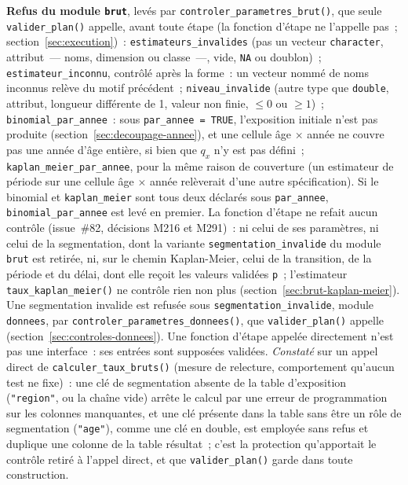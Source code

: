 \documentclass[a4paper,11pt]{article}
\newcommand{\code}[1]{\texttt{\small #1}}
\begin{document}
\medskip
\textbf{Refus du module \code{brut}}, levés par
\code{controler\_parametres\_brut()}, que seule \code{valider\_plan()}
appelle, avant toute étape (la fonction d'étape ne l'appelle pas~;
section~\ref{sec:execution})~:
\code{estimateurs\_invalides}
(pas un vecteur \code{character}, attribut~--- noms, dimension ou classe~---,
vide, \code{NA} ou doublon)~; \code{estimateur\_inconnu}, contrôlé
après la forme~: un vecteur nommé de noms inconnus relève du motif
précédent~; \code{niveau\_invalide} (autre type que
\code{double}, attribut, longueur différente de 1, valeur non finie, $\le 0$
ou $\ge 1$)~; \code{binomial\_par\_annee}~: sous \code{par\_annee = TRUE},
l'exposition initiale n'est pas produite (section~\ref{sec:decoupage-annee}),
et une cellule âge $\times$ année ne couvre pas une année d'âge entière, si
bien que $q_x$ n'y est pas défini~; \code{kaplan\_meier\_par\_annee}, pour la
même raison de couverture (un estimateur de période sur une cellule âge
$\times$ année relèverait d'une autre spécification). Si le binomial et
\code{kaplan\_meier} sont tous deux déclarés sous \code{par\_annee},
\code{binomial\_par\_annee} est levé en premier.
La fonction d'étape ne refait aucun contrôle (issue~\#82, décisions M216
et M291)~: ni celui de ses paramètres, ni celui de la segmentation, dont la
variante \code{segmentation\_invalide} du module \code{brut} est retirée,
ni, sur le chemin Kaplan-Meier, celui de la transition, de la période et du
délai, dont elle reçoit les valeurs validées \code{p}~; l'estimateur
\code{taux\_kaplan\_meier()} ne contrôle rien non plus
(section~\ref{sec:brut-kaplan-meier}). Une segmentation invalide est
refusée sous \code{segmentation\_invalide}, module \code{donnees}, par
\code{controler\_parametres\_donnees()}, que \code{valider\_plan()}
appelle (section~\ref{sec:controles-donnees}). Une fonction d'étape
appelée directement n'est pas une interface~: ses entrées sont supposées
validées. \emph{Constaté} sur un appel direct de
\code{calculer\_taux\_bruts()} (mesure de relecture, comportement qu'aucun
test ne fixe)~: une clé de segmentation absente de la table d'exposition
(\code{"region"}, ou la chaîne vide) arrête le calcul par une erreur de
programmation sur les colonnes manquantes, et une clé présente dans la
table sans être un rôle de segmentation (\code{"age"}), comme une clé en
double, est employée sans refus et duplique une colonne de la table
résultat~; c'est la protection qu'apportait le contrôle retiré à l'appel
direct, et que \code{valider\_plan()} garde dans toute construction.
\end{document}
